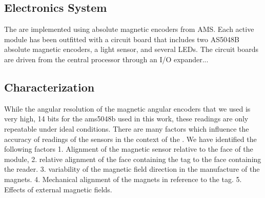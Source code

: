 \subsection{\tagNamePlural Electronics System}
\label{sec:tagsElectronics}

The \tagNamePlural are implemented using absolute magnetic encoders from AMS. Each active module has been outfitted with a circuit board that
includes two AS5048B absolute magnetic encoders, a light sensor, and several LEDs. The circuit boards are driven from the central processor 
through an I/O expander...










\subsection{\tagNamePlural Characterization}
\label{sec:tagsElectronics}





While the angular resolution of the magnetic angular encoders that we used is very high, 14 bits for the ams5048b used in this work, these readings are only repeatable under ideal conditions. There are many factors which influence the accuracy of readings of the sensors in the context of the \tagNamePlural. We have identified the following factors 1. Alignment of the magnetic sensor relative to the face of the module, 2. relative alignment of the face containing the tag to the face containing the reader. 3. variability of the magnetic field direction in the manufacture of the magnets. 4. Mechanical alignment of the magnets in reference to the tag. 5. Effects of external magnetic fields.

